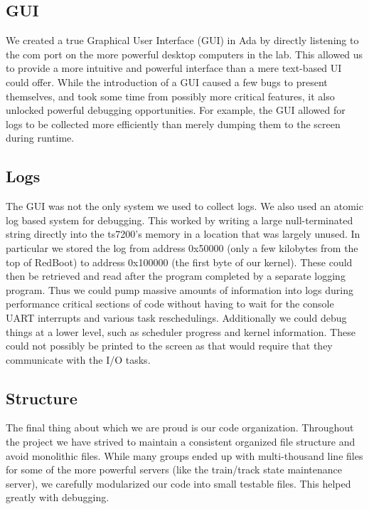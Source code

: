 \documentclass{amsart} \usepackage{amsmath} \usepackage{upgreek}
\begin{document}
\subsection*{GUI}

We created a true Graphical User Interface (GUI) in Ada by directly listening to
the com port on the more powerful desktop computers in the lab. This allowed us
to provide a more intuitive and powerful interface than a mere text-based UI
could offer. While the introduction of a GUI caused a few bugs to present
themselves, and took some time from possibly more critical features, it also
unlocked powerful debugging opportunities. For example, the GUI allowed for
logs to be collected more efficiently than merely dumping them to the screen
during runtime.

\subsection*{Logs}

The GUI was not the only system we used to collect logs. We also used an atomic
log based system for debugging. This worked by writing a large null-terminated
string directly into the ts7200's memory in a location that was largely unused.
In particular we stored the log from address 0x50000 (only a few kilobytes from
the top of RedBoot) to address 0x100000 (the first byte of our kernel). These
could then be retrieved and read after the program completed by a separate
logging program. Thus we could pump massive amounts of information into logs
during performance critical sections of code without having to wait for the
console UART interrupts and various task reschedulings. Additionally we could
debug things at a lower level, such as scheduler progress and kernel
information. These could not possibly be printed to the screen as that would
require that they communicate with the I/O tasks.

\subsection*{Structure}

The final thing about which we are proud is our code organization. Throughout
the project we have strived to maintain a consistent organized file structure
and avoid monolithic files. While many groups ended up with multi-thousand line
files for some of the more powerful servers (like the train/track state
maintenance server), we carefully modularized our code into small testable
files. This helped greatly with debugging.
\end{document}
